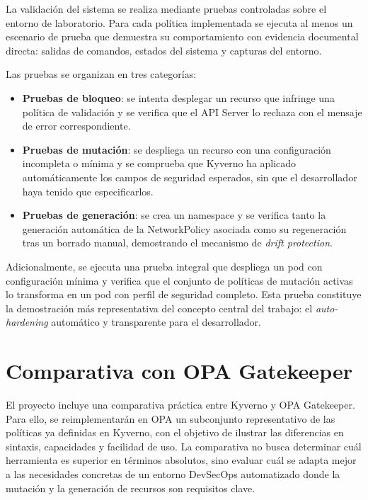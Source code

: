 La validación del sistema se realiza mediante pruebas controladas sobre el entorno de laboratorio. Para cada política implementada se ejecuta al menos un escenario de prueba que demuestra su comportamiento con evidencia documental directa: salidas de comandos, estados del sistema y capturas del entorno.

Las pruebas se organizan en tres categorías:

\begin{itemize}
    \item \textbf{Pruebas de bloqueo}: se intenta desplegar un recurso que infringe una política de validación y se verifica que el API Server lo rechaza con el mensaje de error correspondiente.
    \item \textbf{Pruebas de mutación}: se despliega un recurso con una configuración incompleta o mínima y se comprueba que Kyverno ha aplicado automáticamente los campos de seguridad esperados, sin que el desarrollador haya tenido que especificarlos.
    \item \textbf{Pruebas de generación}: se crea un namespace y se verifica tanto la generación automática de la NetworkPolicy asociada como su regeneración tras un borrado manual, demostrando el mecanismo de \textit{drift protection}.
\end{itemize}

Adicionalmente, se ejecuta una prueba integral que despliega un pod con configuración mínima y verifica que el conjunto de políticas de mutación activas lo transforma en un pod con perfil de seguridad completo. Esta prueba constituye la demostración más representativa del concepto central del trabajo: el \textit{auto-hardening} automático y transparente para el desarrollador.

\section{Comparativa con OPA Gatekeeper}

El proyecto incluye una comparativa práctica entre Kyverno y OPA Gatekeeper. Para ello, se reimplementarán en OPA un subconjunto representativo de las políticas ya definidas en Kyverno, con el objetivo de ilustrar las diferencias en sintaxis, capacidades y facilidad de uso. La comparativa no busca determinar cuál herramienta es superior en términos absolutos, sino evaluar cuál se adapta mejor a las necesidades concretas de un entorno DevSecOps automatizado donde la mutación y la generación de recursos son requisitos clave.

